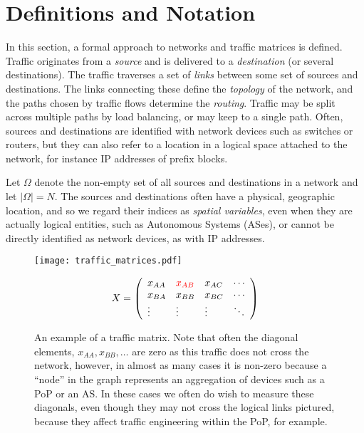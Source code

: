 
\clearpage
\section{Definitions and Notation}
\label{sec:tm}

In this section, a formal approach to networks and traffic matrices is
defined.  Traffic originates from a \emph{source} and is delivered to
a \emph{destination} (or several destinations). The traffic traverses
a set of \emph{links} between some set of sources and destinations.
The links connecting these define the \emph{topology} of the network,
and the paths chosen by traffic flows determine the {\em
  routing}. Traffic may be split across multiple paths by load
balancing, or may keep to a single path.  Often, sources and
destinations are identified with network devices such as switches or
routers, but they can also refer to a location in a logical space
attached to the network, for instance IP addresses of prefix blocks.

Let $\Omega$ denote the non-empty set of all sources and destinations
in a network and let $|\Omega| = N$.  The sources and destinations
often have a physical, geographic location, and so we regard their
indices as {\em spatial variables}, even when they are actually
logical entities, such as Autonomous Systems (ASes), or cannot be
directly identified as network devices, as with IP addresses.

\begin{figure}
  \begin{center}
    \begin{minipage}[m]{0.64\columnwidth}
      \vspace{0pt}
      \texttt{[image: traffic\_matrices.pdf]}      
    \end{minipage}
    \hspace{-10mm}
    \begin{minipage}[m]{0.3\columnwidth}
      \vspace{0pt}
      $$ X = \displaystyle
              \left( \begin{array}{lllll}
                x_{AA} & {\color{red} x_{AB}} & x_{AC} & \cdots \\
                x_{BA} & x_{BB} & x_{BC} & \cdots \\
                \vdots & \vdots & \vdots & \ddots \\
	      \end{array} \right)
    $$
  \end{minipage}
  \caption{An example of a traffic matrix. Note that often the
    diagonal elements, $x_{AA}, x_{BB}, \ldots$ are zero as this
    traffic does not cross the network, however, in almost as many
    cases it is non-zero because a ``node'' in the graph represents an
    aggregation of devices such as a PoP or an AS. In these cases we
    often do wish to measure these diagonals, even though they may not
    cross the logical links pictured, because they affect traffic
    engineering within the PoP, for example.
  \label{fig:tm} }
  \end{center}
\end{figure}


